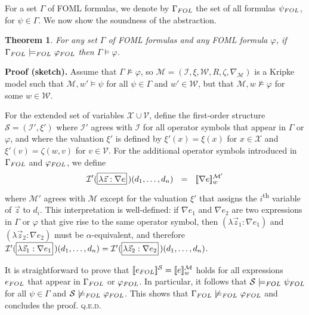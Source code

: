 \documentclass{easychair}
\renewcommand{\qed}{\hspace*{\fill}\textsc{q.e.d.}}
\renewcommand{\th}{\textsuperscript{th}\xspace}
\newcommand{\sem}[1]{\ensuremath{[\![ #1 ]\!]}}
\newcommand{\FOL}[1]{\ensuremath{#1_{\textit{\scriptsize FOL}}}}
\newcommand{\folmodels}{\mathop{\models_{\textit{\scriptsize FOL}}}}
\newcommand{\nfolmodels}{\mathop{\not\models_{\textit{\scriptsize FOL}}}}
\newcommand{\modal}{\nabla}
\newcommand{\II}{\mathcal{I}}
\newcommand{\MM}{\mathcal{M}}
\renewcommand{\SS}{\mathcal{S}}
\newcommand{\VV}{\mathcal{V}}
\newcommand{\WW}{\mathcal{W}}
\newcommand{\XX}{\mathcal{X}}
\newcommand{\B}[1]{\framebox{\rule{0pt}{.6em}\ensuremath{\!\tlachars #1\!}}\,}
\newcommand{\edmargin}[2]{\marginpar{\raggedright\footnotesize\color{red}#1: #2}}
\newcommand{\edmargin}[2]{}
\def\llmargin{\edmargin{LL}}
\newtheorem{theorem}{Theorem}
\newenvironment{proofsketch}{\par\noindent\textbf{Proof (sketch).}\quad}{\medskip}
\let\tlachars\relax
\let\notla\relax
\begin{document}
For a set $\Gamma$ of FOML formulas, we denote by $\FOL{\Gamma}$ the set of all
formulas $\FOL{\psi}$, for $\psi \in \Gamma$. We now show the soundness of the
abstraction.
%
\begin{theorem}\label{thm:coal-modal}
  For any set $\Gamma$ of FOML formulas and any FOML formula $\varphi$,
  if $\FOL{\Gamma} \,\folmodels \,\FOL{\varphi}$ then $\Gamma \models \varphi$.
\end{theorem}
\begin{proofsketch}
  Assume that $\Gamma \not\models \varphi$, so
  $\MM = (\II, \xi, \WW, R, \zeta, \modal_{\MM})$ is a Kripke model such that
  $\MM,w' \models \psi$ for all $\psi \in \Gamma$ and $w' \in \WW$, but that
  $\MM,w \not\models \varphi$ for some $w \in \WW$.

  For the extended set of variables $\XX \cup \VV$, define the first-order
  structure $\SS = (\II', \xi')$ where $\II'$ agrees with $\II$ for all operator
  symbols that appear in $\Gamma$ or $\varphi$, and where the valuation
  $\xi'$ is
  defined by $\xi'(x) = \xi(x)$ for $x \in \XX$
  and $\xi'(v) = \zeta(w,v)$ for $v
  \in \VV$. For the additional operator symbols introduced in $\FOL{\Gamma}$ and
  $\FOL{\varphi}$, we define
  \[
    \II'(\B{\lambda \vec{z}: \modal e})(d_1, \ldots, d_n)\ \ =\ \
    \sem{\modal e}^{\MM'}_w
  \]
  where $\MM'$ agrees with $\MM$ except for the valuation $\xi'$ that assigns
  the $i$\th variable of $\vec{z}$ to $d_i$. This interpretation is
  well-defined: if
  $\modal e_1$ and $\modal e_2$ are two expressions in $\Gamma$ or $\varphi$ that
  give rise to the same operator symbol, then $(\lambda \vec{z}_1 : \modal e_1)$
  and $(\lambda \vec{z}_2 : \modal e_2)$ must be $\alpha$-equivalent, and
  therefore $\II'(\B{\lambda \vec{z}_1: \modal e_1})(d_1, \ldots, d_n) =
  \II'(\B{\lambda \vec{z}_2: \modal e_2})(d_1, \ldots, d_n)$.

  It is straightforward to prove that $\notla\sem{\FOL{e}}^{\SS} = \sem{e}^{\MM}_w$
  holds for all expressions $\FOL{e}$ that appear in $\FOL{\Gamma}$ or
  $\FOL{\varphi}$. In particular, it follows that $\SS \,\folmodels \,\FOL{\psi}$
  for all $\psi \in \Gamma$ and $\SS \,\nfolmodels\, \FOL{\varphi}$. This shows that
  $\FOL{\Gamma} \,\nfolmodels\, \FOL{\varphi}$ and concludes the proof.
  \qed
\end{proofsketch}
\end{document}
